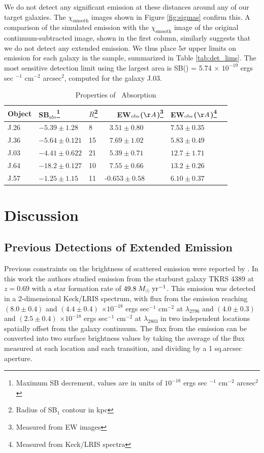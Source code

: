 \documentclass[twocolumn]{aastex61}
\def \msunperyr {{\; M_{\odot}\rm \;yr^{-1}}}
\begin{document}
We do not detect any significant  emission at these distances around any of our target galaxies. The $\chi_{\text{smooth}}$ images shown in Figure \ref{fig:sigmas} confirm this. A comparison of the simulated emission with the $\chi_{\text{smooth}}$ image of the original continuum-subtracted image, shown in the first column, similarly suggests that we do not detect any extended  emission. We thus place $5\sigma$ upper limits on  emission for each galaxy in the sample, summarized in Table \ref{tab:det_lims}. The most sensitive detection limit using the largest area is SB() = 5.74 $\times$ $10^{-19}$ ergs sec $^{-1}$ cm$^{-2}$ arcsec$^2$, computed for the galaxy J.03. 
\begin{table}[]
\centering
\caption{Properties of \ Absorption\label{tab:abs_props}}  
\begin{tabular}{llllll} \hline \hline
Object & SB$_{abs}$\footnote{Maximum SB decrement, values are in units of $10^{-18}$ ergs sec $^{-1}$ cm$^{-2}$ arcsec$^2$} & $R$\footnote{Radius of SB$_1$ contour in kpc} &\ \ \ EW$_{\rm{obs}}$($\AA$)\footnote{ Measured from EW images} & EW$_{\rm{obs}}$($\AA$)\footnote{Measured from Keck/LRIS spectra}  \\  \hline
J.26 &  $-5.39 \pm 1.28 $ & 8 &     $\ \ \ 3.51 \pm 0.80$ & $7.53 \pm 0.35 $\\
J.36 &  $-5.64 \pm 0.121 $ & 15 & $\ \ \ 7.69 \pm 1.02$ & $5.83 \pm 0.49$\\
J.03 &  $-4.41 \pm 0.622 $ & 21 & $\ \ \ 5.39 \pm 0.71$ & $12.7 \pm 1.71$\\
J.64 &  $-18.2 \pm 0.127 $ & 10 & $\ \ \ 7.55 \pm 0.66$ & $13.2 \pm 0.26$\\
J.57 &  $-1.25 \pm 1.15   $ & 11& -$0.653 \pm 0.58$ & $6.10 \pm 0.37$\\ \hline
\end{tabular}
\end{table}


\section{Discussion}\label{sec:discussion}
\subsection{Previous Detections of Extended  Emission}
Previous constraints on the brightness of scattered  emission were reported by \cite{Rubin_2011}. In this work the authors studied emission from the starburst galaxy TKRS 4389 at $z = 0.69$ with a star formation rate of $49.8\msunperyr$. This emission was detected in a 2-dimensional Keck/LRIS spectrum, with flux from the emission reaching $(8.0 \pm 0.4)$ and $(4.4 \pm 0.4)$ $\times10^{-18}$ ergs sec$^{-1}$ cm$^{-2}$ at  $\lambda _{2796}$ and $(4.0 \pm 0.3)$ and $(2.5 \pm 0.4)$ $\times10^{-18}$ ergs sec$^{-1}$ cm$^{-2}$ at $\lambda_{2803}$ in two independent locations spatially offset from the galaxy continuum. The flux from the emission can be converted into two surface brightness values by taking the average of the flux measured at each location and each transition, and dividing by a 1 sq.arcsec aperture. 
\end{document}
